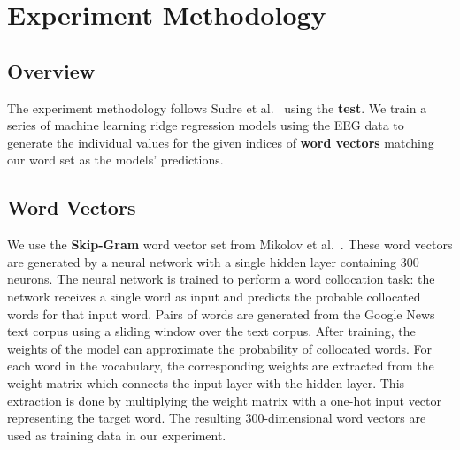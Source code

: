 \section{Experiment Methodology}
\label{sec:methodology}

\subsection{Overview}
The experiment methodology follows Sudre et al.~\cite{Sudre2012} using the {\bf 
\tvt test}. We train a series of machine learning ridge regression models using 
the EEG data to generate the individual values for the given indices of {\bf 
word vectors} matching our word set as the models' predictions.

\subsection{Word Vectors}
We use the {\bf Skip-Gram} word vector set from Mikolov et 
al.~\cite{Mikolov2013}. These word vectors are generated by a neural network 
with a single hidden layer containing 300 neurons. The neural network is 
trained to perform a word collocation task: the network receives a single word 
as input and predicts the probable collocated words for that input word. Pairs 
of words are generated from the Google News text corpus using a sliding window 
over the text corpus. After training, the weights of the model can approximate 
the probability of collocated words. For each word in the vocabulary, the 
corresponding weights are extracted from the weight matrix which connects the 
input layer with the hidden layer. This extraction is done by multiplying the 
weight matrix with a one-hot input vector representing the target word. The 
resulting 300-dimensional word vectors are used as training data in our 
experiment.

